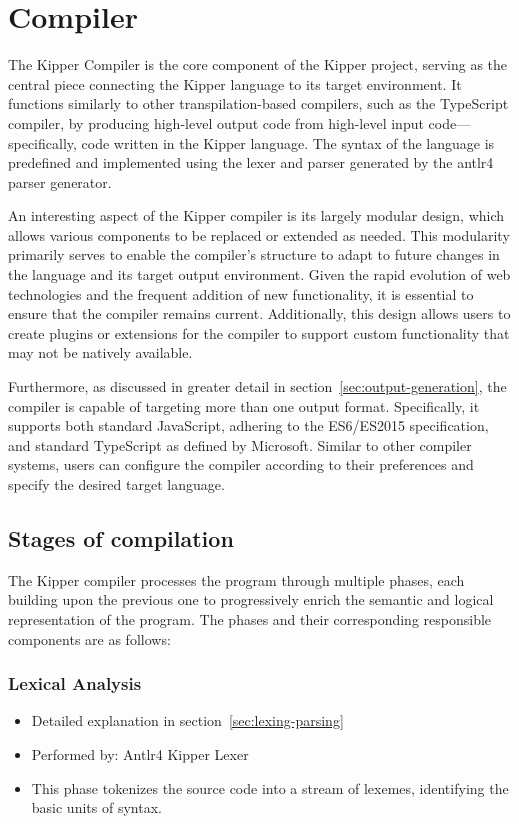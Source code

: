 \section{Compiler}
\label{sec:compiler}

The Kipper Compiler is the core component of the Kipper project, serving as the central piece connecting the Kipper language to its target environment. It functions similarly to other \gls{transpilation}-based compilers, such as the TypeScript compiler, by producing high-level output code from high-level input code—specifically, code written in the Kipper language. The syntax of the language is predefined and implemented using the lexer and parser generated by the \Gls{antlr4} parser generator. 

An interesting aspect of the Kipper compiler is its largely modular design, which allows various components to be replaced or extended as needed. This modularity primarily serves to enable the compiler's structure to adapt to future changes in the language and its target output environment. Given the rapid evolution of web technologies and the frequent addition of new functionality, it is essential to ensure that the compiler remains current. Additionally, this design allows users to create plugins or extensions for the compiler to support custom functionality that may not be natively available.

Furthermore, as discussed in greater detail in section~\ref{sec:output-generation}, the compiler is capable of targeting more than one output format. Specifically, it supports both standard JavaScript, adhering to the ES6/ES2015 specification, and standard TypeScript as defined by Microsoft. Similar to other compiler systems, users can configure the compiler according to their preferences and specify the desired target language.

\subsection{Stages of compilation}

The Kipper compiler processes the program through multiple phases, each building upon the previous one to progressively enrich the semantic and logical representation of the program. The phases and their corresponding responsible components are as follows:

\subsubsection{Lexical Analysis}
\begin{itemize}
	\item Detailed explanation in section~\ref{sec:lexing-parsing}
	\item Performed by: Antlr4 Kipper Lexer
	\item This phase tokenizes the source code into a stream of lexemes, identifying the basic units of syntax.
\end{itemize}

